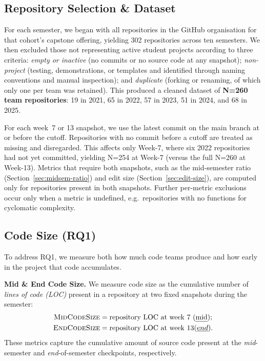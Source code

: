 \documentclass[sigconf,authorversion]{acmart}
\begin{document}
\subsection{Repository Selection \& Dataset}
\label{sec:dataset}
For each semester, we began with all repositories in the GitHub organisation for that cohort's capstone offering, yielding 302 repositories across ten semesters. We then excluded those not representing active student projects according to three criteria: \emph{empty or inactive} (no commits or no source code at any snapshot); \emph{non-project} (testing, demonstrations, or templates and identified through naming conventions and manual inspection); and \emph{duplicate} (forking or renaming, of which only one per team was retained). This produced a cleaned dataset of \textbf{N=260 team repositories}: 19 in 2021, 65 in 2022, 57 in 2023, 51 in 2024, and 68 in 2025.

For each week~7 or 13 snapshot, we use the latest commit on the main branch at or before the cutoff. Repositories with no commit before a cutoff are treated as missing and disregarded. This affects only Week-7, where six 2022 repositories had not yet committed, yielding N=254 at Week-7 (versus the full N=260 at Week-13). Metrics that require both snapshots, such as the mid-semester ratio (Section~\ref{sec:midsem-ratio}) and edit size (Section~\ref{sec:edit-size}), are computed only for repositories present in both snapshots. Further per-metric exclusions occur only when a metric is undefined, e.g.\ repositories with no functions for cyclomatic complexity.

\subsection{Code Size (RQ1)}
\label{sec:code-size}
To address RQ1, we measure both how much code teams produce and how early in the project that code accumulates.

\textbf{Mid \& End Code Size.}
\label{sec:loc}
We measure code size as the cumulative number of \emph{lines of code (LOC)} present in a repository at two fixed snapshots during the semester:
%
\begin{align*}
\textsc{MidCodeSize} &= \text{repository LOC at week 7 (\emph{mid})}; \\
\textsc{EndCodeSize} &= \text{repository LOC at week 13} (\emph{end}).
\end{align*}
%
These metrics capture the cumulative amount of source code present at the \emph{mid}-semester and \emph{end}-of-semester checkpoints, respectively.
\end{document}
